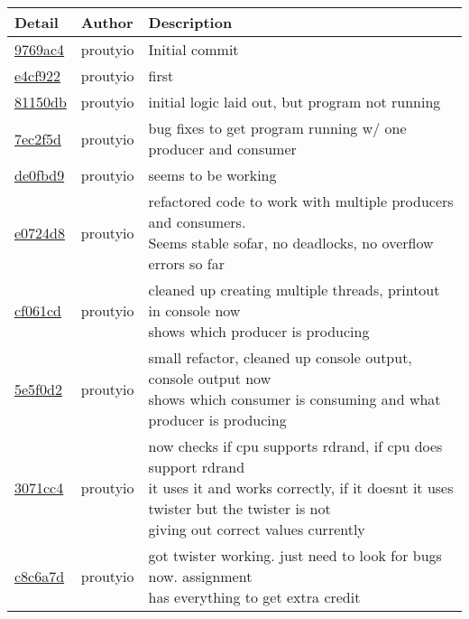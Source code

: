 \begin{tabular}{l | l | l}\textbf{Detail} & \textbf{Author} & \textbf{Description}\\\hline
\href{https://github.com/proutyio/OSU_CS444/commit/9769ac4a40558433934646fe1fe6426f0e217689}{9769ac4} & proutyio & Initial commit\\\hline
\href{https://github.com/proutyio/OSU_CS444/commit/e4cf92298ac6089ef189aac4e6182a0f406ebb2e}{e4cf922} & proutyio & first\\\hline
\href{https://github.com/proutyio/OSU_CS444/commit/81150dbb3fa01eb2805bee6f06f491259db3668d}{81150db} & proutyio & initial logic laid out, but program not running\\\hline
\href{https://github.com/proutyio/OSU_CS444/commit/7ec2f5d1d883588ae57ebc1634dc53f1c97d62a2}{7ec2f5d} & proutyio & bug fixes to get program running w/ one producer and consumer\\\hline
\href{https://github.com/proutyio/OSU_CS444/commit/de0fbd97085100f75ee6d3072508f773e03c6984}{de0fbd9} & proutyio & seems to be working\\\hline
\href{https://github.com/proutyio/OSU_CS444/commit/e0724d83919763a8973b29e086fb1b6d6a8cd0ad}{e0724d8} & proutyio & \makecell[l]{refactored code to work with multiple producers and consumers.\\Seems stable sofar, no deadlocks, no overflow errors so far}\\\hline
\href{https://github.com/proutyio/OSU_CS444/commit/cf061cde8d3d8490caeece057124dbee4680f790}{cf061cd} & proutyio & \makecell[l]{cleaned up creating multiple threads, printout in console now\\shows which producer is producing}\\\hline
\href{https://github.com/proutyio/OSU_CS444/commit/5e5f0d222e66b635132332b9444d2c2531941208}{5e5f0d2} & proutyio & \makecell[l]{small refactor, cleaned up console output, console output now\\shows which consumer is consuming and what producer is producing}\\\hline
\href{https://github.com/proutyio/OSU_CS444/commit/3071cc4db902f25c3dd1ee6ebd7f58403d41d133}{3071cc4} & proutyio & \makecell[l]{now checks if cpu supports rdrand, if cpu does support rdrand\\it uses it and works correctly, if it doesnt it uses twister but the twister is not\\giving out correct values currently}\\\hline
\href{https://github.com/proutyio/OSU_CS444/commit/c8c6a7d61cab0f87a80aaa2ba6cd9598aac791ee}{c8c6a7d} & proutyio & \makecell[l]{got twister working. just need to look for bugs now. assignment\\has everything to get extra credit}\\\hline

\end{tabular}

